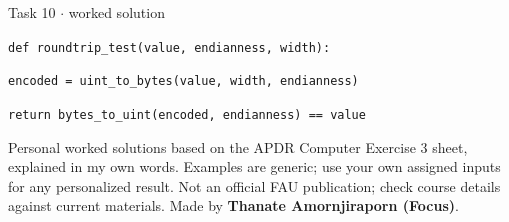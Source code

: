 \documentclass[11pt]{article}
\begin{document}
\begin{keepsection}
\begin{workedbox}{Task 10 \ensuremath{\cdot} worked solution}
\begin{enumerate}
\begin{tcolorbox}[colback=Paperblue,colframe=Paperblue,boxrule=0pt,arc=0pt,left=7pt,right=7pt,top=5pt,bottom=5pt]
\noindent\hspace*{0em}\texttt{}\par
\noindent\hspace*{0em}\texttt{def roundtrip\_test(value, endianness, width):}\par
\noindent\hspace*{1em}\texttt{encoded = uint\_to\_bytes(value, width, endianness)}\par
\noindent\hspace*{1em}\texttt{return bytes\_to\_uint(encoded, endianness) == value}\par
\end{tcolorbox}
\end{enumerate}
\end{workedbox}

\end{keepsection}

\vfill{\small Personal worked solutions based on the APDR Computer Exercise 3 sheet, explained in my own words. Examples are generic; use your own assigned inputs for any personalized result. Not an official FAU publication; check course details against current materials. Made by \textbf{Thanate Amornjiraporn (Focus)}.}
\end{document}
